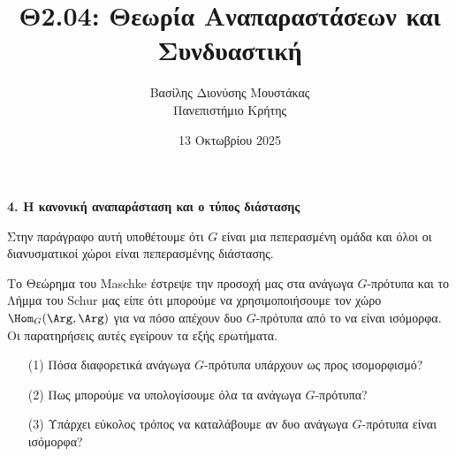 \documentclass[12pt,a4paper,reqno]{amsart}
\title{Θ2.04: Θεωρία Αναπαραστάσεων και Συνδυαστική}
\author[Β.~Δ. Μουστακας]{Βασίλης Διονύσης Μουστάκας \\ Πανεπιστήμιο Κρήτης}
\date{13 Οκτωβρίου 2025}
\begin{document}
\begingroup
\def\uppercasenonmath#1{} %
\let\MakeUppercase\relax %
\maketitle
\endgroup

\setcounter{section}{4}
\thispagestyle{empty}

\begin{center}
    \textbf{4. Η κανονική αναπαράσταση και ο τύπος διάστασης
}
\end{center}

Στην παράγραφο αυτή υποθέτουμε ότι $G$ είναι μια πεπερασμένη ομάδα και όλοι οι διανυσματικοί χώροι είναι πεπερασμένης διάστασης.

Το Θεώρημα του Maschke έστρεψε την προσοχή μας στα ανάγωγα $G$-πρότυπα και το Λήμμα του Schur μας είπε ότι μπορούμε να χρησιμοποιήσουμε τον χώρο $\Hom_G(\Arg,\Arg)$ για να  πόσο απέχουν δυο $G$-πρότυπα από το να είναι ισόμορφα. Οι παρατηρήσεις αυτές εγείρουν τα εξής ερωτήματα.
\begin{questions}
\leavevmode
\begin{itemize}
    \item[(1)] Πόσα διαφορετικά ανάγωγα $G$-πρότυπα υπάρχουν ως προς ισομορφισμό?
    \item[(2)] Πως μπορούμε να υπολογίσουμε όλα τα ανάγωγα $G$-πρότυπα?
    \item[(3)] Υπάρχει εύκολος τρόπος να καταλάβουμε αν δυο ανάγωγα $G$-πρότυπα είναι ισόμορφα?
\end{itemize}
\end{questions}
\end{document}
